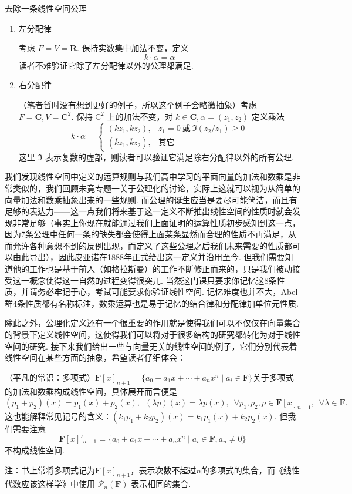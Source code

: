 \begin{example}{}{去除一条线性空间公理}
\begin{enumerate}
        \item 左分配律

        考虑 $F=V=\mathbf{R}$. 保持实数集中加法不变，定义
        \[
            k\cdot \alpha = \alpha
        \]
        读者不难验证它除了左分配律以外的公理都满足.

        \item 右分配律

        （笔者暂时没有想到更好的例子，所以这个例子会略微抽象）考虑 $F=\mathbf{C}, V=\mathbf{C}^2$. 保持 $\mathbb{C}^2$ 上的加法不变，对 $k\in\mathbf{C}, \alpha = (z_1, z_2)$ 定义乘法
        \[
            k\cdot\alpha = \begin{cases}
                (k z_1, k z_2), & z_1 = 0~\text{或}~\Im(z_2 / z_1) \geqslant 0\\
                (\overline{k} z_1, \overline{k} z_2), & \text{其它}
            \end{cases}
        \]
        这里 $\Im$ 表示复数的虚部，则读者可以验证它满足除右分配律以外的所有公理.
    \end{enumerate}
\end{example}

我们发现线性空间中定义的运算规则与我们高中学习的平面向量的加法和数乘是非常类似的，我们回顾未竟专题一关于公理化的讨论，实际上这就可以视为从简单的向量加法和数乘抽象出来的一些规则. 而公理的诞生应当是要尽可能简洁，而且有足够的表达力——这一点我们将来基于这一定义不断推出线性空间的性质时就会发现非常足够（事实上你现在就能通过我们上面证明的运算性质初步感知到这一点，因为7条公理中任何一条的缺失都会使得上面某条显然而合理的性质不再满足，从而允许各种意想不到的反例出现，而定义了这些公理之后我们未来需要的性质都可以由此导出），因此皮亚诺在1888年正式给出这一定义并沿用至今. 但我们需要知道他的工作也是基于前人（如格拉斯曼）的工作不断修正而来的，只是我们被动接受这一概念使得这一自然的过程变得很突兀. 当然这门课只要求你记忆这8条性质，并请务必牢记于心，考试可能要求你验证线性空间. 记忆难度也并不大，Abel 群4条性质都有名称标注，数乘运算也是易于记忆的结合律和分配律加单位元性质.

除此之外，公理化定义还有一个很重要的作用就是使得我们可以不仅仅在向量集合的背景下定义线性空间，这使得我们可以将对于很多结构的研究都转化为对于线性空间的研究. 接下来我们给出一些与向量无关的线性空间的例子，它们分别代表着线性空间在某些方面的抽象，希望读者仔细体会：

\begin{example}{}{}
    （平凡的常识：多项式）$\mathbf{F}[x]_{n+1}=\{a_0+a_1x+\cdots+a_nx^n \mid a_i\in\mathbf{F}\}$关于多项式的加法和数乘构成线性空间，具体展开而言便是
    \[
        (p_1+p_2)(x)=p_1(x)+p_2(x),\enspace(\lambda p)(x)=\lambda p(x),\enspace\forall p_1,p_2,p\in\mathbf{F}[x]_{n+1},\enspace\forall \lambda\in\mathbf{F}.
    \]
    这也能解释常见记号的含义：$(k_1p_1+k_2p_2)(x)=k_1p_1(x)+k_2p_2(x)$.
    但我们需要注意
    \[\mathbf{F}[x]'_{n+1}=\{a_0+a_1x+\cdots+a_nx^n \mid a_i\in\mathbf{F}, a_n\neq 0\}\]
    不构成线性空间.

    注：书上常将多项式记为$\mathbf{F}[x]_{n+1}$，表示次数不超过$n$的多项式的集合，而《线性代数应该这样学》中使用 $\mathcal{P}_n(\mathbf{F})$ 表示相同的集合.
\end{example}

